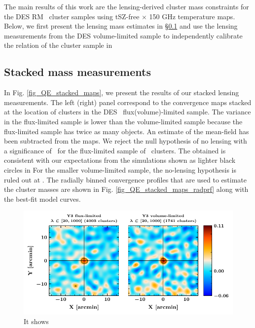The main results of this work are the lensing-derived cluster mass constraints for the DES RM \whichyear\ cluster samples using \sptpol{} tSZ-free $\times$ 150 GHz temperature maps.
Below, we first present the lensing mass estimates in \S\ref{sec_temp_results} and use the lensing measurements from the DES \whichyear{} volume-limited sample to independently calibrate the \ML{} relation of the cluster sample in %
\subsection{Stacked mass measurements}
\label{sec_temp_results}
In Fig. \ref{fig_QE_stacked_maps}, we present the results of our stacked lensing measurements. 
The left (right) panel correspond to the convergence maps stacked at the location of clusters in the DES \whichyear\ flux(volume)-limited sample.
The variance in the flux-limited sample is lower than the volume-limited sample because the flux-limited sample has twice as many objects. 
An estimate of the mean-field has been subtracted from the maps.
We reject the null hypothesis of no lensing with a significance of \howmanysigmaforfullsample\ for the flux-limited sample of \howmanyclustersinfullsample\ clusters. 
The obtained \snr{} is consistent with our expectations from the simulations shown as lighter black circles in %
For the smaller volume-limited sample, the no-lensing hypothesis is ruled out at  \howmanysigmaforcosmosample.
The radially binned convergence profiles that are used to estimate the cluster masses are shown in Fig. \ref{fig_QE_stacked_maps_radprf} along with the best-fit model curves. 
\begin{figure}
\includegraphics[width=\linewidth]{figs/kappa_model_MF_y3_v6_4_22_full_vl_JODY.pdf}
\caption{It shows}
\label{fig:fig_QE_stacked_maps}
\end{figure}

